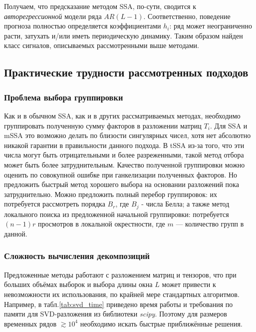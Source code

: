 			 Получаем, что предсказание методом SSA, по-сути, сводится к \textit{авторегрессионной} модели ряда $ AR(L - 1) $. Соответственно, поведение прогноза полностью определяется коэффициентами $ h_i $: ряд может неограниченно расти, затухать и/или иметь периодическую динамику. Таким образом найден класс сигналов, описываемых рассмотренными выше методами.
			 
			 \subsection*{Практические трудности рассмотренных подходов}
			 
			 	\subsubsection*{Проблема выбора группировки}
			 	
			 	Как и в обычном SSA, как и в других рассматриваемых методах, необходимо группировать полученную сумму факторов в разложении матриц $ T_i $. Для SSA и mSSA это возможно делать по близости сингулярных чисел, хотя нет абсолютно никакой гарантии в правильности данного подхода. В tSSA из-за того, что эти числа могут быть отрицательными и более разреженными, такой метод отбора может быть более затруднительным. Качество полученной группировки можно оценить по совокупной ошибке при ганкелизации полученных факторов. Но предложить быстрый метод хорошего выбора на основании разложений пока затруднительно. Можно предложить полный перебор группировок: их потребуется рассмотреть порядка $ B_r $, где $ B_j $ - числа Белла; а также метод локального поиска из предложенной начальной группировки: потребуется $ (n - 1) r $ просмотров в локальной окрестности, где $ m $ --- количество групп в данной.
			 	
			 	\subsubsection*{Сложность вычисления декомпозиций}
			 	
			 	Предложенные методы работают с разложением матриц и тензоров, что при больших объёмах выборок и выбора длины окна $ L $ может привести к невозможности их использования, по крайней мере стандартных алгоритмов. Например, в табл.\ref{tab:svd_time}  приведено время работы и требования по памяти для SVD-разложения из библиотеки \textit{scipy}. Поэтому для размеров временных рядов $ \gtrsim 10^4 $ необходимо искать быстрые приближённые решения.
			 	
